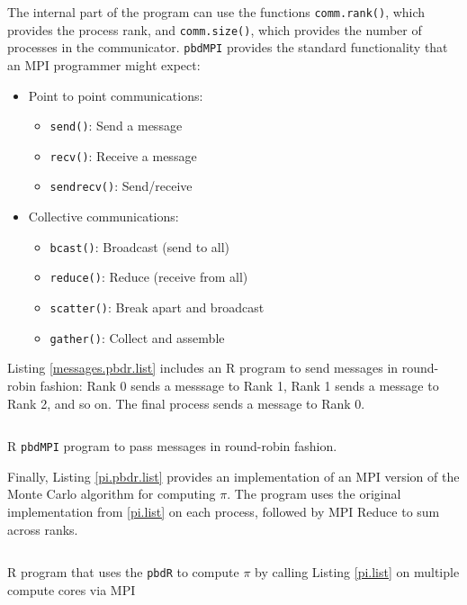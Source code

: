 The internal part of the program can use the functions  \texttt{comm.rank()}, which provides the process rank, and \texttt{comm.size()}, which provides the number of processes in the communicator. \texttt{pbdMPI} provides the standard functionality that an MPI programmer might expect:
\begin{itemize}
\item Point to point communications:
  \begin{itemize}
    \item \texttt{send()}: Send a message
    \item \texttt{recv()}: Receive a message
    \item \texttt{sendrecv()}: Send/receive
  \end{itemize}
\item Collective communications:
  \begin{itemize}
    \item \texttt{bcast()}: Broadcast (send to all)
    \item \texttt{reduce()}: Reduce (receive from all)
    \item \texttt{scatter()}: Break apart and broadcast
    \item \texttt{gather()}: Collect and assemble
  \end{itemize}
\end{itemize}

Listing \ref{messages.pbdr.list} includes an R program to send messages in round-robin fashion: Rank 0 sends a messsage to Rank 1, Rank 1 sends a message to Rank 2, and so on. The final process sends a message to Rank 0.
\begin{listing}[ht]
\inputminted{R}{code/L22/messages_pbdr.r}
\caption{R \texttt{pbdMPI} program to pass messages in round-robin fashion.}
\label{messages.pbdr.list}
\end{listing}

Finally, Listing \ref{pi.pbdr.list} provides an implementation of an MPI version of the Monte Carlo algorithm for computing $\pi$. The program uses the original implementation from \ref{pi.list} on each process, followed by MPI Reduce to sum across ranks.
\begin{listing}[ht]
\inputminted{R}{code/L22/mcpi_pbdr.r}
\caption{R program that uses the \texttt{pbdR} to compute $\pi$ by calling Listing \ref{pi.list} on multiple compute cores via MPI}
\label{pi.pbdr.list}
\end{listing}

